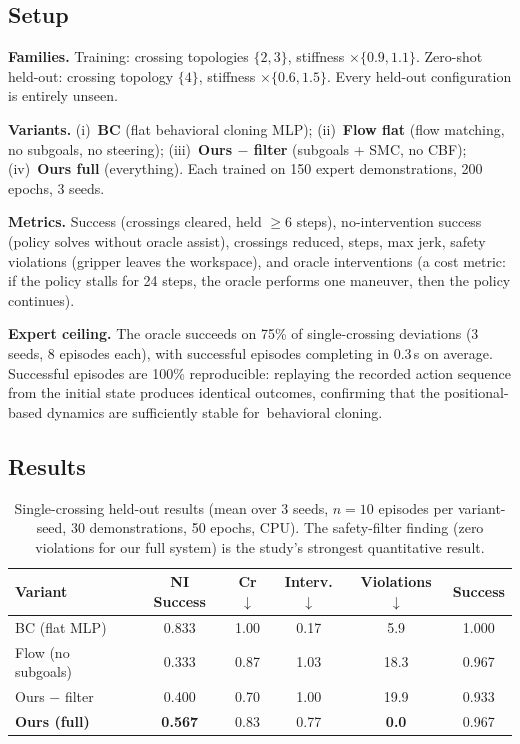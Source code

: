\documentclass[11pt,a4paper]{article}
\begin{document}
\subsection{Setup}
\label{sec:setup}

\textbf{Families.} Training: crossing topologies $\{2, 3\}$, stiffness
$\times\{0.9, 1.1\}$. Zero-shot held-out: crossing topology $\{4\}$, stiffness
$\times\{0.6, 1.5\}$. Every held-out configuration is entirely unseen.

\textbf{Variants.} (i)~\textbf{BC} (flat behavioral cloning MLP); (ii)~\textbf{Flow
flat} (flow matching, no subgoals, no steering); (iii)~\textbf{Ours $-$ filter}
(subgoals + SMC, no CBF); (iv)~\textbf{Ours full} (everything). Each trained on
150 expert demonstrations, 200 epochs, 3 seeds.

\textbf{Metrics.} Success (crossings cleared, held $\ge 6$ steps),
no-intervention success (policy solves without oracle assist), crossings
reduced, steps, max jerk, safety violations (gripper leaves the workspace),
and oracle interventions (a cost metric: if the policy stalls for 24 steps, the
oracle performs one maneuver, then the policy continues).

\textbf{Expert ceiling.} The oracle succeeds on 75\% of single-crossing
deviations (3 seeds, 8 episodes each), with successful episodes completing in
0.3\,s on average. Successful episodes are 100\% reproducible: replaying the
recorded action sequence from the initial state produces identical outcomes,
confirming that the positional-based dynamics are sufficiently stable for\ behavioral cloning.

\subsection{Results}
\label{sec:results-table}

\begin{table}[t]
\centering
\caption{Single-crossing held-out results (mean over 3 seeds, $n=10$ episodes
per variant-seed, 30 demonstrations, 50 epochs, CPU). The safety-filter
finding (zero violations for our full system) is the study's strongest
quantitative result.}
\label{tab:main}
\begin{tabular}{@{}lccccc@{}}
\toprule
Variant & NI Success & Cr$\downarrow$ & Interv.$\downarrow$ &
Violations$\downarrow$ & Success \\
\midrule
BC (flat MLP) & 0.833 & 1.00 & 0.17 & 5.9 & 1.000 \\
Flow (no subgoals) & 0.333 & 0.87 & 1.03 & 18.3 & 0.967 \\
Ours $-$ filter & 0.400 & 0.70 & 1.00 & 19.9 & 0.933 \\
\textbf{Ours (full)} & \textbf{0.567} & 0.83 & 0.77 & \textbf{0.0} & 0.967 \\
\bottomrule
\end{tabular}
\end{table}
\end{document}
